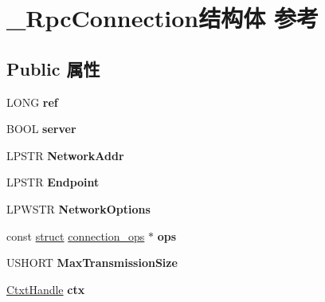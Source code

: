 \hypertarget{struct___rpc_connection}{}\section{\+\_\+\+Rpc\+Connection结构体 参考}
\label{struct___rpc_connection}
\subsection*{Public 属性}
\begin{DoxyCompactItemize}
\item 
\mbox{\label{struct___rpc_connection_a549270784061e83800da103a19cf26fe}} 
L\+O\+NG {\bfseries ref}
\item 
\mbox{\label{struct___rpc_connection_a41c9123361be3a1a850e543e2ce922d7}} 
B\+O\+OL {\bfseries server}
\item 
\mbox{\label{struct___rpc_connection_a031edb9aa10041265cd9c07495e11015}} 
L\+P\+S\+TR {\bfseries Network\+Addr}
\item 
\mbox{\label{struct___rpc_connection_a8bc83724968ae1f3777cddc68f3ca6bb}} 
L\+P\+S\+TR {\bfseries Endpoint}
\item 
\mbox{\label{struct___rpc_connection_a4d86498cd25d2574dbf8f381c76cd9d3}} 
L\+P\+W\+S\+TR {\bfseries Network\+Options}
\item 
\mbox{\label{struct___rpc_connection_ab88e16c63c03a9dcbdf0d80fa0334058}} 
const \hyperlink{interfacestruct}{struct} \hyperlink{structconnection__ops}{connection\+\_\+ops} $\ast$ {\bfseries ops}
\item 
\mbox{\label{struct___rpc_connection_a76c9b209019e4b9eaef4c8850a5997c5}} 
U\+S\+H\+O\+RT {\bfseries Max\+Transmission\+Size}
\item 
\mbox{\label{struct___rpc_connection_ae85018a39f41bdfdbe72f4e938ff9ec8}} 
\hyperlink{struct___sec_handle}{Ctxt\+Handle} {\bfseries ctx}
\item 
\mbox{\label{struct___rpc_connection_a1cc1f793a41e9686b07c028f4bf2ffdf}} 

\end{DoxyCompactItemize}
